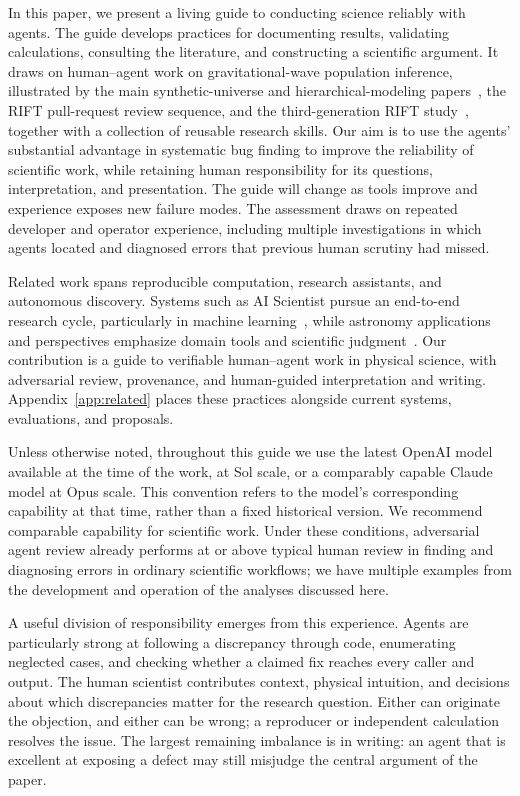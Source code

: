 \documentclass[aps,prd,reprint,nofootinbib]{revtex4-2}
\begin{document}
In this paper, we present a living guide to conducting science reliably with agents. The guide develops practices for documenting results, validating calculations, consulting the literature, and constructing a scientific argument. It draws on human--agent work on gravitational-wave population inference, illustrated by the main synthetic-universe and hierarchical-modeling papers~\cite{SyntheticUniverses,HierarchicalMethods}, the RIFT pull-request review sequence, and the third-generation RIFT study~\cite{RIFTThreeG}, together with a collection of reusable research skills. Our aim is to use the agents' substantial advantage in systematic bug finding to improve the reliability of scientific work, while retaining human responsibility for its questions, interpretation, and presentation. The guide will change as tools improve and experience exposes new failure modes. The assessment draws on repeated developer and operator experience, including multiple investigations in which agents located and diagnosed errors that previous human scrutiny had missed.

Related work spans reproducible computation, research assistants, and autonomous discovery. Systems such as AI Scientist pursue an end-to-end research cycle, particularly in machine learning~\cite{AIScientist,AIResearch2026}, while astronomy applications and perspectives emphasize domain tools and scientific judgment~\cite{Mephisto,TingUnderstanding}. Our contribution is a guide to verifiable human--agent work in physical science, with adversarial review, provenance, and human-guided interpretation and writing. Appendix~\ref{app:related} places these practices alongside current systems, evaluations, and proposals.

Unless otherwise noted, throughout this guide we use the latest OpenAI model available at the time of the work, at Sol scale, or a comparably capable Claude model at Opus scale. This convention refers to the model's corresponding capability at that time, rather than a fixed historical version. We recommend comparable capability for scientific work. Under these conditions, adversarial agent review already performs at or above typical human review in finding and diagnosing errors in ordinary scientific workflows; we have multiple examples from the development and operation of the analyses discussed here.

A useful division of responsibility emerges from this experience. Agents are particularly strong at following a discrepancy through code, enumerating neglected cases, and checking whether a claimed fix reaches every caller and output. The human scientist contributes context, physical intuition, and decisions about which discrepancies matter for the research question. Either can originate the objection, and either can be wrong; a reproducer or independent calculation resolves the issue. The largest remaining imbalance is in writing: an agent that is excellent at exposing a defect may still misjudge the central argument of the paper.
\end{document}
